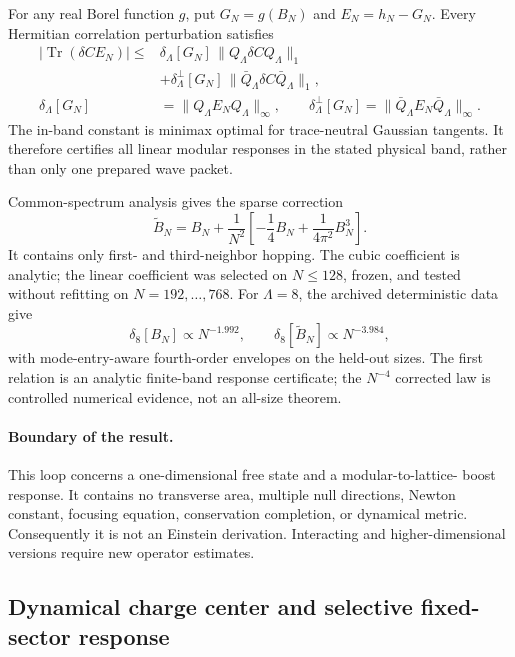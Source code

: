For any real Borel function \(g\), put \(G_N=g(B_N)\) and
\(E_N=h_N-G_N\).  Every Hermitian correlation perturbation satisfies
\begin{align}
 |\operatorname{Tr}(\delta C E_N)|
 \le{}&\delta_\Lambda[G_N]\,
 \|Q_\Lambda\delta C Q_\Lambda\|_1\nonumber\\
 &+\delta_\Lambda^\perp[G_N]\,
 \|\bar Q_\Lambda\delta C\bar Q_\Lambda\|_1,
 \label{eq:loop-modular-certificate}\\
 \delta_\Lambda[G_N]
 &=\|Q_\Lambda E_NQ_\Lambda\|_\infty,\qquad
 \delta_\Lambda^\perp[G_N]
 =\|\bar Q_\Lambda E_N\bar Q_\Lambda\|_\infty .
\end{align}
The in-band constant is minimax optimal for trace-neutral Gaussian tangents.
It therefore certifies all linear modular responses in the stated physical
band, rather than only one prepared wave packet.

Common-spectrum analysis gives the sparse correction
\begin{equation}
 \widetilde B_N=B_N+\frac1{N^2}
 \left[-\frac14B_N+\frac{1}{4\pi^2}B_N^3\right].
 \label{eq:loop-range-three}
\end{equation}
It contains only first- and third-neighbor hopping.  The cubic coefficient is
analytic; the linear coefficient was selected on \(N\le128\), frozen, and
tested without refitting on \(N=192,\ldots,768\).  For \(\Lambda=8\), the
archived deterministic data give
\begin{equation}
 \delta_8[B_N]\propto N^{-1.992},
 \qquad
 \delta_8[\widetilde B_N]\propto N^{-3.984},
 \label{eq:loop-modular-scaling}
\end{equation}
with mode-entry-aware fourth-order envelopes on the held-out sizes.  The
first relation is an analytic finite-band response certificate; the
\(N^{-4}\) corrected law is controlled numerical evidence, not an all-size
theorem.

\paragraph{Boundary of the result.}
This loop concerns a one-dimensional free state and a modular-to-lattice-
boost response.  It contains no transverse area, multiple null directions,
Newton constant, focusing equation, conservation completion, or dynamical
metric.  Consequently it is not an Einstein derivation.  Interacting and
higher-dimensional versions require new operator estimates.

\subsection{Dynamical charge center and selective fixed-sector response}
\label{sec:loop-center}

